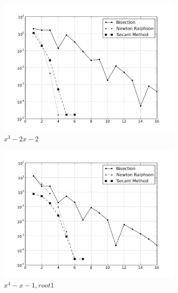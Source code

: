 \documentclass[12,a4paper]{article}
\begin{document}
    \begin{figure}
        \centering
        \begin{subfigure}[t]{0.49\textwidth}
            \includegraphics[width=\textwidth]{plots/root7.png}
            \caption{$x^3 - 2x - 2$}
            \label{fig:root7}
        \end{subfigure}
        \begin{subfigure}[t]{0.49\textwidth}
            \includegraphics[width=\textwidth]{plots/root8.png}
            \caption{$x^4-x-1, root 1$}
            \label{fig:root8}
        \end{subfigure}
        \begin{subfigure}[b]{0.49\textwidth}

\end{subfigure}
\end{figure}
\end{document}
